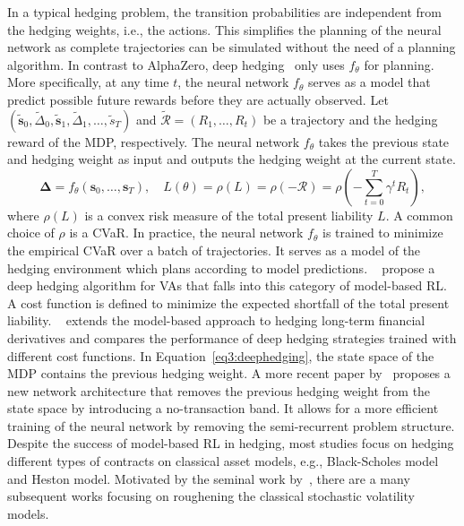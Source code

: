 In a typical hedging problem, the transition probabilities are independent from the hedging weights, i.e., the actions.
This simplifies the planning of the neural network as complete trajectories can be simulated without the need of a planning algorithm.
In contrast to AlphaZero, deep hedging~\citep{buehler2019deep} only uses $f_{\theta}$ for planning.
More specifically, at any time $t$, the neural network $f_{\theta}$ serves as a model that predict possible future rewards before they are actually observed.
Let $(\tilde{\mathbf{s}}_0, \tilde{\Delta}_0, \tilde{\mathbf{s}}_1, \tilde{\Delta}_1, \ldots, \tilde{s}_T)$ and $\tilde{\mathcal{R}} = (R_1, \ldots, R_t)$ be a trajectory and the hedging reward of the MDP, respectively.
The neural network $f_{\theta}$ takes the previous state and hedging weight as input and outputs the hedging weight at the current state.
\begin{equation} \label{eq3:deephedging}
    \mathbf{\Delta} = f_{\theta}(\mathbf{s}_0, \ldots, \mathbf{s}_T), \quad L(\theta) = \rho(L) = \rho(-\mathcal{R}) = \rho(- \sum_{t=0}^{T} \gamma^t R_t),
\end{equation}
where $\rho(L)$ is a convex risk measure of the total present liability $L$. 
A common choice of $\rho$ is a CVaR.
In practice, the neural network $f_{\theta}$ is trained to minimize the empirical CVaR over a batch of trajectories.
It serves as a model of the hedging environment which plans according to model predictions.
~\cite{xu2020variable} propose a deep hedging algorithm for VAs that falls into this category of model-based RL.
A cost function is defined to minimize the expected shortfall of the total present liability.
~\cite{carbonneau2021deep} extends the model-based approach to hedging long-term financial derivatives and compares the performance of deep hedging strategies trained with different cost functions.
In Equation~\ref{eq3:deephedging}, the state space of the MDP contains the previous hedging weight.
A more recent paper by~\cite{imaki2021no} proposes a new network architecture that removes the previous hedging weight from the state space by introducing a no-transaction band.
It allows for a more efficient training of the neural network by removing the semi-recurrent problem structure.
Despite the success of model-based RL in hedging, most studies focus on hedging different types of contracts on classical asset models, e.g., Black-Scholes model and Heston model.
Motivated by the seminal work by~\cite{gatheral2022volatility}, there are a many subsequent works focusing on roughening the classical stochastic volatility models. 
